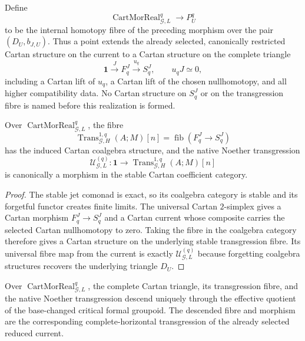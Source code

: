 \begin{construction}
Define
\[
\boxed{
\operatorname{CartMorReal}_{\mathcal G,L}^{q}
\longrightarrow
P_U^q
}
\]
to be the internal homotopy fibre of the preceding morphism over the pair
$(D_U,b_{J,U})$.  Thus a point extends the already selected, canonically restricted
Cartan structure on the current to a Cartan structure on the complete triangle
\[
\mathbf1\xrightarrow{J}F_q^J\xrightarrow{u_q}S_q^J,
\qquad
u_qJ\simeq0,
\]
including a Cartan lift of $u_q$, a Cartan lift of the chosen nullhomotopy, and all
higher compatibility data.  No Cartan structure on $S_q^J$ or on the
transgression fibre is named before this realization is formed.
\end{construction}

\begin{proposition}
\label{prop:symmetry-noether-native-transgression-becomes-cartan-morphism}
Over $\operatorname{CartMorReal}_{\mathcal G,L}^{q}$, the fibre
\[
\operatorname{Trans}_{\mathcal G,H}^{1,q}(A;M)[n]
=
\operatorname{fib}(F_q^J\to S_q^J)
\]
has the induced Cartan coalgebra structure, and the native Noether transgression
\[
\mathcal U_{\mathcal G,L}^{(q)}:
\mathbf1\longrightarrow
\operatorname{Trans}_{\mathcal G,H}^{1,q}(A;M)[n]
\]
is canonically a morphism in the stable Cartan coefficient category.
\end{proposition}

\begin{proof}
The stable jet comonad is exact, so its coalgebra category is stable and its
forgetful functor creates finite limits.  The universal Cartan $2$-simplex gives a
Cartan morphism $F_q^J\to S_q^J$ and a Cartan current whose composite carries the
selected Cartan nullhomotopy to zero.  Taking the fibre in the coalgebra category
therefore gives a Cartan structure on the underlying stable transgression fibre.
Its universal fibre map from the current is exactly
$\mathcal U_{\mathcal G,L}^{(q)}$ because forgetting coalgebra structures recovers
the underlying triangle $D_U$.
\end{proof}

\begin{theorem}
\label{thm:symmetry-noether-descent-of-the-constructed-current-transgression}
Over $\operatorname{CartMorReal}_{\mathcal G,L}^{q}$, the complete Cartan triangle,
its transgression fibre, and the native Noether transgression descend uniquely
through the effective quotient of the base-changed critical formal groupoid.  The
descended fibre and morphism are the corresponding complete-horizontal
transgression of the already selected reduced current.
\end{theorem}

